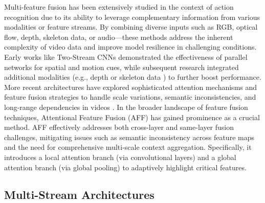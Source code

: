 Multi-feature fusion has been extensively studied in the context of action recognition due to its ability to leverage complementary information from various modalities or feature streams\cite{feichtenhofer2016convolutional}\cite{carreira2017quo}. By combining diverse inputs such as RGB, optical flow, depth, skeleton data, or audio—these methods address the inherent complexity of video data and improve model resilience in challenging conditions. Early works like Two-Stream CNNs \cite{simonyan2014two} demonstrated the effectiveness of parallel networks for spatial and motion cues, while subsequent research integrated additional modalities (e.g., depth \cite{yang2012recognizing} or skeleton data \cite{li2010action}) to further boost performance. More recent architectures have explored sophisticated attention mechanisms and feature fusion strategies to handle scale variations, semantic inconsistencies, and long-range dependencies in videos \cite{zhang2020multi}\cite{alamri2019audio}.
In the broader landscape of feature fusion techniques, Attentional Feature Fusion (AFF) \cite{dai2021attentional} has gained prominence as a crucial method. AFF effectively addresses both cross-layer and same-layer fusion challenges, mitigating issues such as semantic inconsistency across feature maps and the need for comprehensive multi-scale context aggregation. Specifically, it introduces a local attention branch (via convolutional layers) and a global attention branch (via global pooling) to adaptively highlight critical features. 



\subsection{Multi-Stream Architectures}

